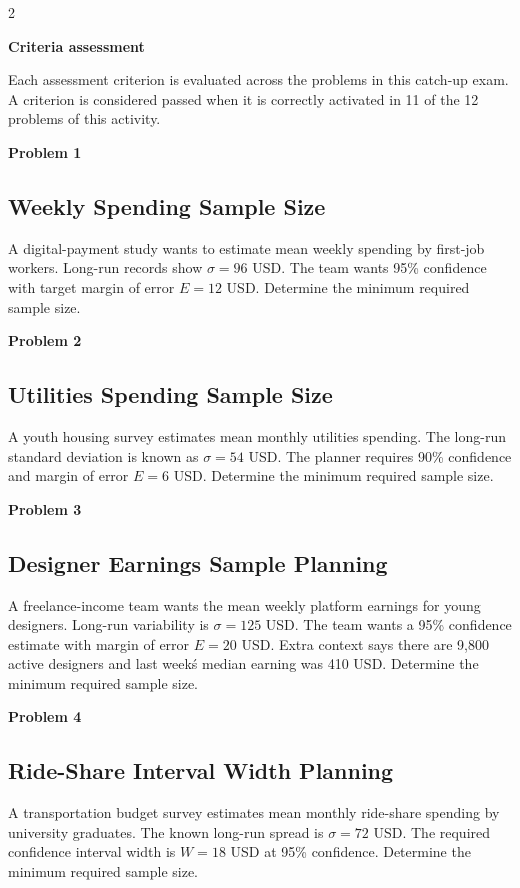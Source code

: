 \documentclass[12pt]{article}
\newcommand{\SubsectionBox}[1]{%
	\noindent\colorbox{gray!30}{\parbox{\linewidth}{\textbf{#1}}}\par\vspace{0.35cm}%
}
\begin{document}
	\begin{multicols}{2}
		\SubsectionBox{Criteria assessment}\vspace{-0.25cm}
		Each assessment criterion is evaluated across the problems in this catch-up exam. A criterion is considered passed when it is correctly activated in 11 of the 12 problems of this activity.
		
		\vspace{0.25cm}
		\SubsectionBox{Problem 1}
		\subsection*{Weekly Spending Sample Size}
		A digital-payment study wants to estimate mean weekly spending by first-job workers. Long-run records show $\sigma = 96$ USD. The team wants 95\% confidence with target margin of error $E = 12$ USD. Determine the minimum required sample size.
		
		\vspace{0.5cm}
		\SubsectionBox{Problem 2}
		\subsection*{Utilities Spending Sample Size}
		A youth housing survey estimates mean monthly utilities spending. The long-run standard deviation is known as $\sigma = 54$ USD. The planner requires 90\% confidence and margin of error $E = 6$ USD. Determine the minimum required sample size.
		
		\vspace{0.5cm}
		\SubsectionBox{Problem 3}
		\subsection*{Designer Earnings Sample Planning}
		A freelance-income team wants the mean weekly platform earnings for young designers. Long-run variability is $\sigma = 125$ USD. The team wants a 95\% confidence estimate with margin of error $E = 20$ USD. Extra context says there are 9{,}800 active designers and last week\'s median earning was 410 USD. Determine the minimum required sample size.
		
		\vspace{0.5cm}
		\SubsectionBox{Problem 4}
		\subsection*{Ride-Share Interval Width Planning}
		A transportation budget survey estimates mean monthly ride-share spending by university graduates. The known long-run spread is $\sigma = 72$ USD. The required confidence interval width is $W = 18$ USD at 95\% confidence. Determine the minimum required sample size.
		

\end{multicols}
\end{document}
